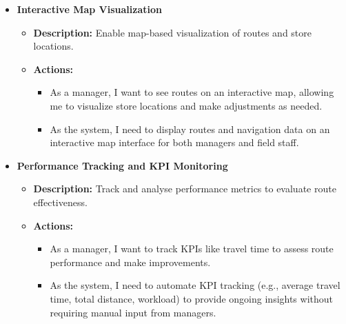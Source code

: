 \begin{itemize}
    \item \textbf{Interactive Map Visualization}
    \begin{itemize}
        \item \textbf{Description:} Enable map-based visualization of routes and store locations.
        \item \textbf{Actions:}
        \begin{itemize}
            \item As a manager, I want to see routes on an interactive map, allowing me to visualize store locations and make adjustments as needed.
            \item As the system, I need to display routes and navigation data on an interactive map interface for both managers and field staff.
        \end{itemize}
    \end{itemize}
    
    \item \textbf{Performance Tracking and KPI Monitoring}
    \begin{itemize}
        \item \textbf{Description:} Track and analyse performance metrics to evaluate route effectiveness.
        \item \textbf{Actions:}
        \begin{itemize}
            \item As a manager, I want to track KPIs like travel time to assess route performance and make improvements.
            \item As the system, I need to automate KPI tracking (e.g., average travel time, total distance, workload) to provide ongoing insights without requiring manual input from managers.
        \end{itemize}
    \end{itemize}
    

    

    
\end{itemize}

